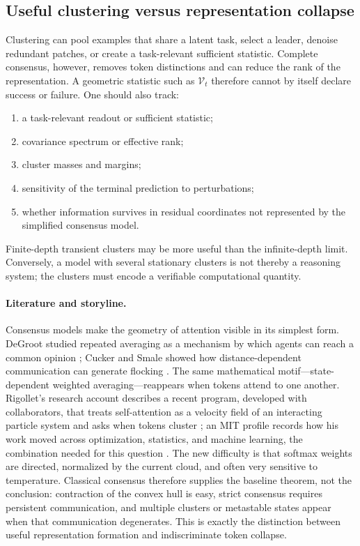\documentclass[11pt]{amsart}
\numberwithin{equation}{section}
\theoremstyle{plain}
\begin{document}
\subsection{Useful clustering versus representation collapse}
Clustering can pool examples that share a latent task, select a leader, denoise
redundant patches, or create a task-relevant sufficient statistic.  Complete
consensus, however, removes token distinctions and can reduce the rank of the
representation.  A geometric statistic such as $\mathcal V_t$ therefore cannot
by itself declare success or failure.  One should also track:
\begin{enumerate}[label=(\roman*),leftmargin=*]
 \item a task-relevant readout or sufficient statistic;
 \item covariance spectrum or effective rank;
 \item cluster masses and margins;
 \item sensitivity of the terminal prediction to perturbations;
 \item whether information survives in residual coordinates not represented by
 the simplified consensus model.
\end{enumerate}
Finite-depth transient clusters may be more useful than the infinite-depth
limit.  Conversely, a model with several stationary clusters is not thereby a
reasoning system; the clusters must encode a verifiable computational
quantity.



\paragraph{\textbf{Literature and storyline.}}
Consensus models make the geometry of attention visible in its simplest
form.  DeGroot studied repeated averaging as a mechanism by which agents can
reach a common opinion \cite{DeGroot1974}; Cucker and Smale showed how
distance-dependent communication can generate flocking
\cite{CuckerSmale2007}.  The same mathematical motif---state-dependent
weighted averaging---reappears when tokens attend to one another.  Rigollet's
research account describes a recent program, developed with collaborators,
that treats self-attention as a velocity field of an interacting particle
system and asks when tokens cluster \cite{RigolletResearchProfile}; an MIT
profile records how his work moved across optimization, statistics, and
machine learning, the combination needed for this question
\cite{RigolletMITProfile2018}.  The new difficulty is that softmax weights are
directed, normalized by the current cloud, and often very sensitive to
temperature.  Classical consensus therefore supplies the baseline theorem,
not the conclusion: contraction of the convex hull is easy, strict consensus
requires persistent communication, and multiple clusters or metastable states
appear when that communication degenerates.  This is exactly the distinction
between useful representation formation and indiscriminate token collapse.
\end{document}
